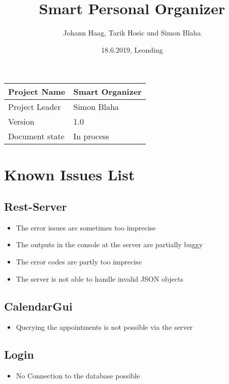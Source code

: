 \documentclass[12pt]{scrartcl}
\title{Smart Personal Organizer}
\author{Johann Haag, Tarik Hosic und Simon Blaha}
\date{18.6.2019, Leonding}
\begin{document}
    \maketitle
    \begin{flushleft}
    \begin{tabular}{|l|l|}
    \hline
    Project Name & Smart Organizer \\ \hline
    Project Leader & Simon Blaha \\ \hline
    Version & 1.0\\ \hline
    Document state & In process \\ \hline
    \end{tabular}
    \end{flushleft}

    \pagebreak
    \tableofcontents
    \pagebreak

    \section{Known Issues List}
    \subsection{Rest-Server}
    \begin{itemize}
        \item The error issues are sometimes too imprecise
        \item The outputs in the console at the server are partially buggy
        \item The error codes are partly too imprecise
        \item The server is not able to handle invalid JSON objects 
    \end{itemize}

    \subsection{CalendarGui}
    \begin{itemize}
        \item Querying the appointments is not possible via the server
    \end{itemize}

    \subsection{Login}
    \begin{itemize}
        \item No Connection to the database possible
    \end{itemize}
\end{document}
